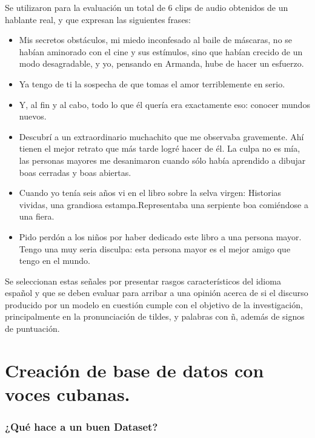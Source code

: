 Se utilizaron para la evaluación un total de 6 clips de audio obtenidos de un hablante real, y que expresan las siguientes frases:
\begin{itemize}
	\item Mis secretos obstáculos, mi miedo inconfesado al baile de máscaras, no se habían aminorado con el cine y sus estímulos, sino que habían crecido de un modo desagradable, y yo, pensando en Armanda, hube de hacer un esfuerzo.
	\item Ya tengo de ti la sospecha de que tomas el amor terriblemente en serio.
	\item Y, al fin y al cabo, todo lo que él quería era exactamente eso: conocer mundos nuevos.
	\item Descubrí a un extraordinario muchachito que me observaba gravemente. Ahí tienen el mejor retrato que más tarde logré hacer de él. La culpa no es mía, las personas mayores me desanimaron cuando sólo había aprendido a dibujar boas cerradas y boas abiertas.
	\item Cuando yo tenía seis años vi en el libro sobre la selva virgen: Historias vividas, una grandiosa estampa.Representaba una serpiente boa comiéndose a una fiera.
	\item Pido perdón a los niños por haber dedicado este libro a una persona mayor. Tengo una muy seria disculpa: esta persona mayor es el mejor amigo que tengo en el mundo.
\end{itemize}

Se seleccionan estas señales por presentar rasgos característicos del idioma español y que se deben evaluar para arribar a una opinión acerca de si el discurso producido por un modelo en cuestión cumple con el objetivo de la investigación, principalmente en la pronunciación de tildes, y palabras con ñ, además de signos de puntuación.  



\section{Creación de base de datos con voces cubanas.}

\subsubsection{¿Qué hace a un buen Dataset?}

